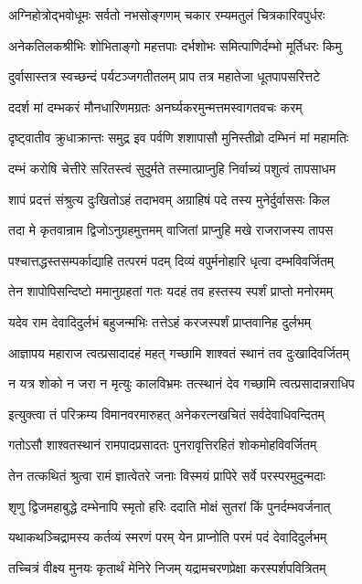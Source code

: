 \twolineshloka
{अग्निहोत्रोद्भवोधूमः सर्वतो नभसोङ्गणम्}
{चकार रम्यमतुलं चित्रकारिवपुर्धरः}%

\twolineshloka
{अनेकतिलकश्रीभिः शोभिताङ्गो महत्तपाः}
{दर्भशोभः समित्पाणिर्दम्भो मूर्तिधरः किमु}%

\twolineshloka
{दुर्वासास्तत्र स्वच्छन्दं पर्यटञ्जगतीतलम्}
{प्राप तत्र महातेजा धूतपापसरित्तटे}%

\twolineshloka
{ददर्श मां दम्भकरं मौनधारिणमग्रतः}
{अनर्घ्यकरमुन्मत्तमस्वागतवचः करम्}%

\twolineshloka
{दृष्ट्वातीव क्रुधाक्रान्तः समुद्र इव पर्वणि}
{शशापासौ मुनिस्तीव्रो दम्भिनं मां महामतिः}%

\twolineshloka
{दम्भं करोषि चेत्तीरे सरितस्त्वं सुदुर्मते}
{तस्मात्प्राप्नुहि निर्वाच्यं पशुत्वं तापसाधम}%

\twolineshloka
{शापं प्रदत्तं संश्रुत्य दुःखितोऽहं तदाभवम्}
{अग्राहिषं पदे तस्य मुनेर्दुर्वाससः किल}%

\twolineshloka
{तदा मे कृतवान्राम द्विजोऽनुग्रहमुत्तमम्}
{वाजितां प्राप्नुहि मखे राजराजस्य तापस}%

\twolineshloka
{पश्चात्तद्धस्तसम्पर्काद्याहि तत्परमं पदम्}
{दिव्यं वपुर्मनोहारि धृत्वा दम्भविवर्जितम्}%

\twolineshloka
{तेन शापोपिसन्दिष्टो ममानुग्रहतां गतः}
{यदहं तव हस्तस्य स्पर्शं प्राप्तो मनोरमम्}%

\twolineshloka
{यदेव राम देवादिदुर्लभं बहुजन्मभिः}
{तत्तेऽहं करजस्पर्शं प्राप्तवानिह दुर्लभम्}%

\twolineshloka
{आज्ञापय महाराज त्वत्प्रसादादहं महत्}
{गच्छामि शाश्वतं स्थानं तव दुःखादिवर्जितम्}%

\twolineshloka
{न यत्र शोको न जरा न मृत्युः कालविभ्रमः}
{तत्स्थानं देव गच्छामि त्वत्प्रसादान्नराधिप}%

\twolineshloka
{इत्युक्त्वा तं परिक्रम्य विमानवरमारुहत्}
{अनेकरत्नखचितं सर्वदेवाधिवन्दितम्}%

\twolineshloka
{गतोऽसौ शाश्वतस्थानं रामपादप्रसादतः}
{पुनरावृत्तिरहितं शोकमोहविवर्जितम्}%

\twolineshloka
{तेन तत्कथितं श्रुत्वा रामं ज्ञात्वेतरे जनाः}
{विस्मयं प्रापिरे सर्वे परस्परमुदुन्मदाः}%

\twolineshloka
{शृणु द्विजमहाबुद्धे दम्भेनापि स्मृतो हरिः}
{ददाति मोक्षं सुतरां किं पुनर्दम्भवर्जनात्}%

\twolineshloka
{यथाकथञ्चिद्रामस्य कर्तव्यं स्मरणं परम्}
{येन प्राप्नोति परमं पदं देवादिदुर्लभम्}%

\twolineshloka
{तच्चित्रं वीक्ष्य मुनयः कृतार्थं मेनिरे निजम्}
{यद्रामचरणप्रेक्षा करस्पर्शपवित्रितम्}%

